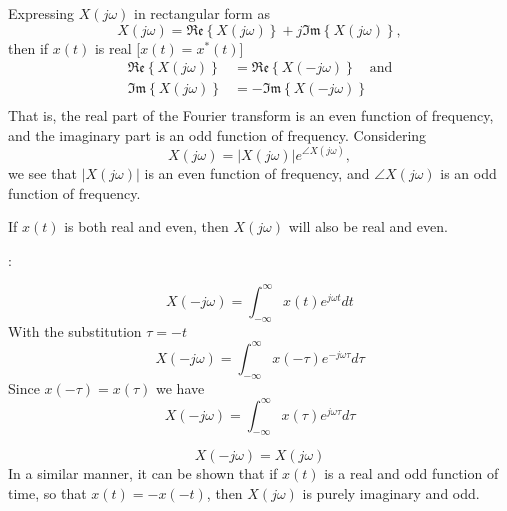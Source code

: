 \begin{frame}
    Expressing $X(j\omega)$ in rectangular form as
    \begin{equation*}
        X(j\omega)
        = \mathfrak{Re}\left\{X(j\omega)\right\} + j\mathfrak{Im}\left\{X(j\omega)\right\},
    \end{equation*}
    then if $x(t)$ is real [$x(t) = x^\ast(t)$]
    \begin{align*}
        \mathfrak{Re}\left\{X(j\omega)\right\} &= \mathfrak{Re}\left\{X(-j\omega)\right\}\quad \text{and}\\
        \mathfrak{Im}\left\{X(j\omega)\right\} &= -\mathfrak{Im}\left\{X(-j\omega)\right\}\\
    \end{align*}
That is, the real part of the Fourier transform is an even function of frequency, and the imaginary part is an odd function of frequency.
\pause
Considering
    \begin{equation*}
        X(j\omega) = |X(j\omega)|e^{\angle X(j\omega)},
    \end{equation*}
    we see that $|X(j\omega)|$ is an even function of frequency, and $\angle X(j\omega)$ is an odd function of frequency.


\end{frame}

\begin{frame}
    If $x(t)$ is both real and even, then $X(j\omega)$ will also be real and even.\par
    :\par
{}
{
    \begin{equation*}
        X(-j\omega) = \int_{-\infty}^{\infty} x(t)e^{j\omega t}dt
    \end{equation*}
    \pause
    With the substitution $\tau = -t$
    \begin{equation*}
        X(-j\omega) = \int_{-\infty}^{\infty} x(-\tau)e^{-j\omega \tau}d\tau
    \end{equation*}
    Since $x(-\tau) = x(\tau)$ we have
    \begin{equation*}
        X(-j\omega) = \int_{-\infty}^{\infty} x(\tau)e^{j\omega \tau}d\tau
    \end{equation*}

    \begin{equation*}
        X(-j\omega) = X(j\omega)
    \end{equation*}
    In a similar manner, it can be shown that if $x(t)$ is a real and odd function of time, so that $x(t) = - x(- t)$, then $X(j\omega)$ is purely imaginary and odd.

}
\end{frame}


